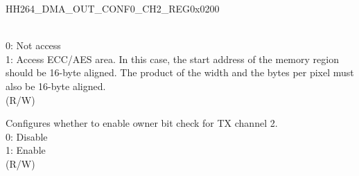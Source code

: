 \begin{register}{H}{H264\_DMA\_OUT\_CONF0\_CH2\_REG}{0x0200}
\begin{regdesc}
\begin{reglist}
    \\0: Not access
    \\1: Access ECC/AES area. In this case, the start address of the memory region should be 16-byte aligned. The product of the width and the bytes per pixel must also be 16-byte aligned. \\(R/W)
    \label{fielddesc:H264DMAOUTCHECKOWNERCH2}\item [H264\_DMA\_OUT\_CHECK\_OWNER\_CH2] Configures whether to enable owner bit check for TX channel 2.\\
    0: Disable\\
    1: Enable \\(R/W)
    
    \item [Continued on the next page...]
    \end{reglist}\end{regdesc}
    \end{register}
    
